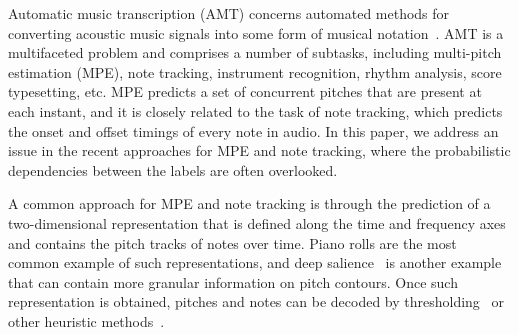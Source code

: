 Automatic music transcription (AMT) concerns automated methods for converting acoustic music signals into some form of musical notation~\cite{benetos2013amt}.
AMT is a multifaceted problem and comprises a number of subtasks, including multi-pitch estimation (MPE), note tracking, instrument recognition, rhythm analysis, score typesetting, etc.
MPE predicts a set of concurrent pitches that are present at each instant, and it is closely related to the task of note tracking, which predicts the onset and offset timings of every note in audio.
In this paper, we address an issue in the recent approaches for MPE and note tracking, where the probabilistic dependencies between the labels are often overlooked.

A common approach for MPE and note tracking is through the prediction of a two-dimensional representation that is defined along the time and frequency axes and contains the pitch tracks of notes over time.
Piano rolls %
are the most common example of such representations, and deep salience~\cite{bittner2017deepsalience} %
is another example that can contain more granular information on pitch contours.
Once such representation is obtained, pitches and notes can be decoded by thresholding~\cite{kelz2016framewise} or other heuristic methods~\cite{kim2018crepe,hawthorne2018onsetsframes}.


